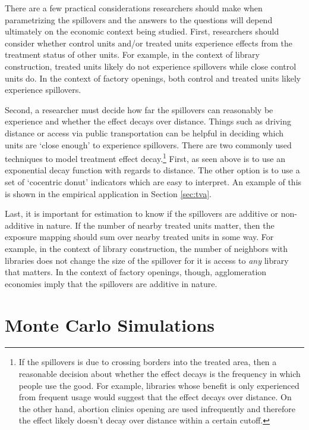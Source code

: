 \documentclass[11pt]{article}
\begin{document}
There are a few practical considerations researchers should make when parametrizing the spillovers and the answers to the questions will depend ultimately on the economic context being studied. First, researchers should consider whether control units and/or treated units experience effects from the treatment status of other units. For example, in the context of library construction, treated units likely do not experience spillovers while close control units do. In the context of factory openings, both control and treated units likely experience spillovers. 

Second, a researcher must decide how far the spillovers can reasonably be experience and whether the effect decays over distance. Things such as driving distance or access via public transportation can be helpful in deciding which units are `close enough' to experience spillovers. There are two commonly used techniques to model treatment effect decay.\footnote{If the spillovers is due to crossing borders into the treated area, then a reasonable decision about whether the effect decays is the frequency in which people use the good. For example, libraries whose benefit is only experienced from frequent usage would suggest that the effect decays over distance. On the other hand, abortion clinics opening are used infrequently and therefore the effect likely doesn't decay over distance within a certain cutoff.} First, as seen above is to use an exponential decay function with regards to distance. The other option is to use a set of `cocentric donut' indicators which are easy to interpret. An example of this is shown in the empirical application in Section \ref{sec:tva}. 

Last, it is important for estimation to know if the spillovers are additive or non-additive in nature. If the number of nearby treated units matter, then the exposure mapping should sum over nearby treated units in some way. For example, in the context of library construction, the number of neighbors with libraries does not change the size of the spillover for it is access to \textit{any} library that matters. In the context of factory openings, though, agglomeration economies imply that the spillovers are additive in nature.




\section{Monte Carlo Simulations}
\label{sec:monte_carlo}
\end{document}
